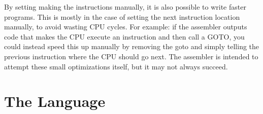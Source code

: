 \documentclass[12pt]{article}
\begin{document}
By setting making the instructions manually, it is also possible to write faster programs.
This is mostly in the case of setting the next instruction location manually, to avoid wasting CPU cycles.
For example: if the assembler outputs code that makes the CPU execute an instruction and then call a GOTO,
you could instead speed this up manually by removing the goto and simply telling the previous instruction where
the CPU should go next. The assembler is intended to attempt these small optimizations itself, but it may not always succeed.

\section{The Language}
\end{document}
